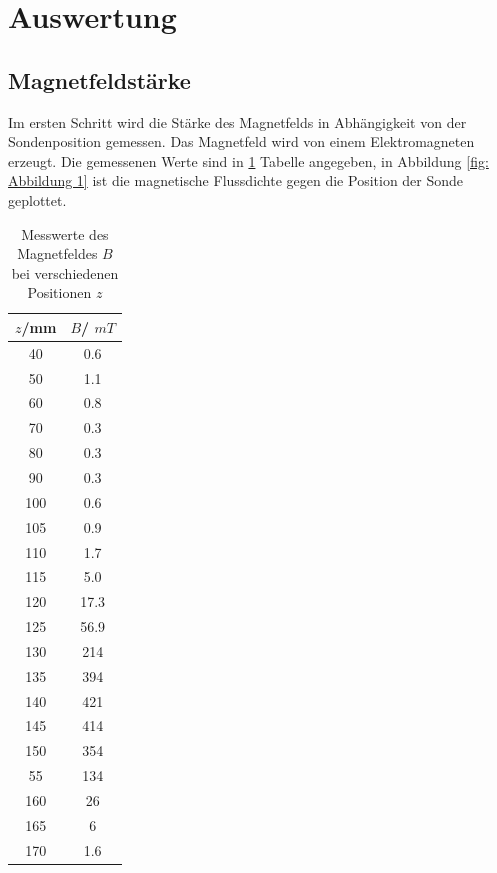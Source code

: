 \section{Auswertung}
\label{sec:Auswertung}



\subsection{Magnetfeldstärke}
Im ersten Schritt wird die Stärke des Magnetfelds in Abhängigkeit von der Sondenposition 
gemessen. Das Magnetfeld wird von einem Elektromagneten erzeugt. Die gemessenen Werte sind in \ref{tab:Tabelle 1}
Tabelle angegeben, in Abbildung \ref{fig: Abbildung 1} ist die magnetische Flussdichte gegen die Position der Sonde geplottet.

\begin{table}[h]
\centering
\begin{tabular}{|c|c|}
\hline   
\(z\)/mm & \(B\)/ \(mT\) \\
\hline
40 & 0.6 \\ 
50 & 1.1 \\ 
60 & 0.8 \\ 
70 & 0.3 \\ 
80 & 0.3 \\ 
90 & 0.3 \\
100 & 0.6 \\ 
105 & 0.9 \\
110 & 1.7 \\ 
115 & 5.0 \\
120 & 17.3 \\ 
125 & 56.9 \\ 
130 & 214 \\
135 & 394 \\
140 & 421 \\ 
145 & 414 \\
150 & 354 \\ 
55 & 134 \\ 
160 & 26 \\
165 & 6 \\ 
170 & 1.6 \\
\hline
\end{tabular}
\caption{Messwerte des Magnetfeldes $B$ bei verschiedenen Positionen $z$} 
\label{tab:Tabelle 1}
\end{table}

